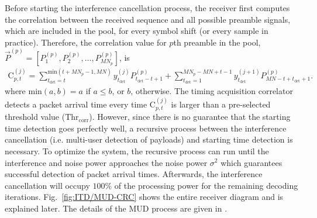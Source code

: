 \documentclass[journal,onecolumn,12pt]{IEEEtran}
\begin{document}
Before starting the interference cancellation process, the receiver first computes the correlation between the received sequence and all possible preamble signals, which are included in the pool, for every symbol shift (or every sample in practice). Therefore, the correlation value for $p$th preamble in the pool, $\vec{P}^{(p)} = [P_1^{(p)}, P_2^{(p)}, \dots, P_{MN_p}^{(p)}]$, is
\begin{align}
	\text{C}_{p,t}^{(j)} = \sum_{t_{\text{det}}=t}^{\text{min}(t+MN_p-1,MN)} y_{t_{\text{det}}}^{(j)}P_{t_{\text{det}}-t+1}^{(p)}+\sum_{t_{\text{det}}=1}^{MN_p-MN+t-1} y_{t_{\text{det}}}^{(j+1)}P_{MN-t+t_{\text{det}}+1}^{(p)}.
\end{align}
where $\text{min}(a,b)=a$ if $a \leq b$, or $b$, otherwise. The timing acquisition correlator detects a packet arrival time every time $\text{C}_{p,t}^{(j)}$ is larger than a pre-selected threshold value ($\text{Thr}_{\text{corr}}$). However, since there is no guarantee that the starting time detection goes perfectly well, a recursive process between the interference cancellation (i.e. multi-user detection of payloads) and starting time detection is necessary. To optimize the system, the recursive process can run until the interference and noise power approaches the noise power $\sigma^2$ which guarantees successful detection of packet arrival times. Afterwards, the interference cancellation will occupy  $100\%$ of the processing power for the remaining decoding iterations. Fig.~\ref{fig:ITD/MUD-CRC} shows the entire receiver diagram and is explained later. The details of the MUD process are given in \cite{TBKN20}.

\end{document}
